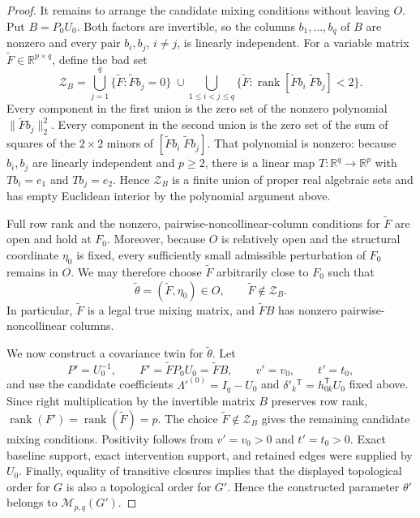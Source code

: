 \documentclass{article}
\begin{document}
\begin{proof}
It remains to arrange the candidate mixing conditions without leaving \(O\).  Put \(B=P_0U_0\).  Both factors are invertible, so the columns \(b_1,\ldots,b_q\) of \(B\) are nonzero and every pair \(b_i,b_j\), \(i\ne j\), is linearly independent.  For a variable matrix \(\widetilde F\in\mathbb R^{p\times q}\), define the bad set
\[
 \mathcal Z_B=
 \bigcup_{j=1}^q\{\widetilde F:\widetilde F b_j=0\}
 \;\cup\!
 \bigcup_{1\le i<j\le q}
 \{\widetilde F:\operatorname{rank}[\widetilde F b_i\;\widetilde F b_j]<2\}.
\]
Every component in the first union is the zero set of the nonzero polynomial
\(
 \|\widetilde F b_j\|_2^2.
\)
Every component in the second union is the zero set of the sum of squares of the \(2\times2\) minors of
\([
\widetilde F b_i\;\widetilde F b_j
]\).  That polynomial is nonzero: because \(b_i,b_j\) are linearly independent and \(p\ge2\), there is a linear map \(T:\mathbb R^q\to\mathbb R^p\) with \(Tb_i=e_1\) and \(Tb_j=e_2\).  Hence \(\mathcal Z_B\) is a finite union of proper real algebraic sets and has empty Euclidean interior by the polynomial argument above.

Full row rank and the nonzero, pairwise-noncollinear-column conditions for \(\widetilde F\) are open and hold at \(F_0\).  Moreover, because \(O\) is relatively open and the structural coordinate \(\eta_0\) is fixed, every sufficiently small admissible perturbation of \(F_0\) remains in \(O\).  We may therefore choose \(\widetilde F\) arbitrarily close to \(F_0\) such that
\[
 \widetilde\theta=(\widetilde F,\eta_0)\in O,
 \qquad \widetilde F\notin\mathcal Z_B.
\]
In particular, \(\widetilde F\) is a legal true mixing matrix, and \(\widetilde F B\) has nonzero pairwise-noncollinear columns.

We now construct a covariance twin for \(\widetilde\theta\).  Let
\[
 P'=U_0^{-1},\qquad
 F'=\widetilde F P_0U_0=\widetilde F B,
 \qquad v'=v_0,\qquad t'=t_0,
\]
and use the candidate coefficients \(\Lambda'^{(0)}=I_q-U_0\) and \(\delta'_k{}^{\mathsf T}=h_{0k}^{\mathsf T}U_0\) fixed above.  Since right multiplication by the invertible matrix \(B\) preserves row rank,
\(
 \operatorname{rank}(F')=\operatorname{rank}(\widetilde F)=p.
\)
The choice \(\widetilde F\notin\mathcal Z_B\) gives the remaining candidate mixing conditions.  Positivity follows from \(v'=v_0>0\) and \(t'=t_0>0\).  Exact baseline support, exact intervention support, and retained edges were supplied by \(U_0\).  Finally, equality of transitive closures implies that the displayed topological order for \(G\) is also a topological order for \(G'\).  Hence the constructed parameter \(\theta'\) belongs to \(\mathcal M_{p,q}(G')\).


\end{proof}
\end{document}
